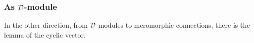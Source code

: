 \subsubsection{As $\mathcal{D}$-module}
\begin{comment}
  \cite[Sec.4.2.2]{Loday2014}
\end{comment}

In the other direction, from $\mathcal{D}$-modules to meromorphic connections, there is
the lemma of the cyclic vector. \TODO{}
\begin{comment}
  \begin{itemize}
    \item \cite[Rem.4.2.6]{Loday2014}
  \end{itemize}
\end{comment}

